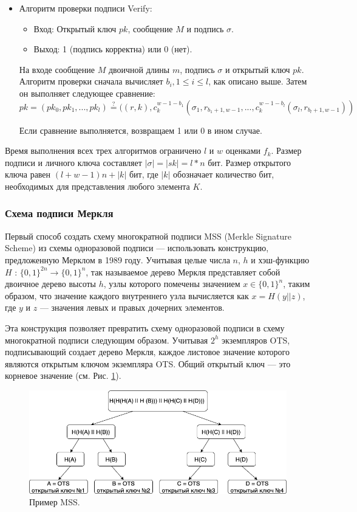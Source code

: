 \documentclass[a4paper, 14pt]{extarticle}
\begin{document}
\begin{itemize}
    \item Алгоритм проверки подписи Verify:

    \begin{itemize}
        \item Вход: Открытый ключ $pk$, сообщение $M$ и подпись $\sigma$.
        \item Выход: 1 (подпись корректна) или 0 (нет).
    \end{itemize}

    На входе сообщение $M$ двоичной длины $m$, подпись $\sigma$ и открытый ключ $pk$. Алгоритм проверки сначала вычисляет $b_{i}, 1 \leq i \leq l$, как описано выше. Затем он выполняет следующее сравнение:
    \[ pk = (pk_{0}, pk_{1}, ..., pk_{l}) \stackrel{?}{=} ((r,k),c^{w - 1 - b_{1}}_{k}(\sigma_{1}, r_{b_{1} + 1, w - 1}, ..., c^{w - 1 - b_{l}}_{k}(\sigma_{l}, r_{b_{l} + 1, w - 1}))\]

    Если сравнение выполняется, возвращаем 1 или 0 в ином случае.
\end{itemize}

Время выполнения всех трех алгоритмов ограничено $l$ и $w$ оценками $f_{k}$. Размер подписи и личного ключа составляет $|\sigma| = |sk| = l*n$ бит. Размер открытого ключа равен $(l + w - 1)n + |k|$ бит, где $|k|$ обозначает количество бит, необходимых для представления любого элемента $K$.

\subsubsection{Схема подписи Меркля}
Первый способ создать схему многократной подписи MSS (Merkle Signature Scheme) из схемы одноразовой подписи --- использовать конструкцию, предложенную Мерклом в 1989 году. Учитывая целые числа $n$, $h$ и хэш-функцию $H$ : $\{0, 1\}^{2n} \rightarrow \{0, 1\}^{n}$, так называемое дерево Меркля представляет собой двоичное дерево высоты $h$, узлы которого помечены значением $x \in \{0, 1\}^{n}$, таким образом, что значение каждого внутреннего узла вычисляется как $x = H(y||z)$, где $y$ и $z$ --- значения левых и правых дочерних элементов.

Эта конструкция позволяет превратить схему одноразовой подписи в схему многократной подписи следующим образом. Учитывая $2^h$ экземпляров OTS, подписывающий создает дерево Меркля, каждое листовое значение которого являются открытым ключом экземпляра OTS. Общий открытый ключ --- это корневое значение (см. Рис. \ref{fig:MSS}).

\begin{figure}[h]
    \centering
    \includegraphics[scale=0.55]{MSS.png}
    \caption{Пример MSS.}
    \label{fig:MSS}
\end{figure}
\end{document}
